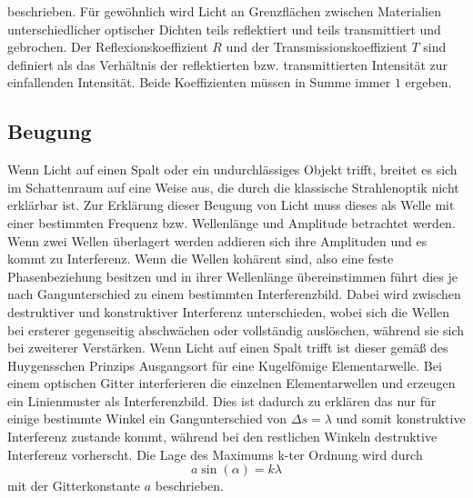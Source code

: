 beschrieben. Für gewöhnlich wird Licht an Grenzflächen zwischen Materialien unterschiedlicher optischer Dichten teils reflektiert und teils transmittiert und gebrochen. Der Reflexionskoeffizient $R$ und der Transmissionskoeffizient $T$ sind definiert als das Verhältnis der reflektierten bzw. transmittierten Intensität zur einfallenden Intensität. Beide Koeffizienten müssen in Summe immer $1$ ergeben.
\subsection{Beugung}
Wenn Licht auf einen Spalt oder ein undurchlässiges Objekt trifft, breitet es sich im Schattenraum auf eine Weise aus, die durch die klassische Strahlenoptik nicht erklärbar ist.
Zur Erklärung dieser Beugung von Licht muss dieses als Welle mit einer bestimmten Frequenz bzw. Wellenlänge und Amplitude betrachtet werden. Wenn zwei Wellen überlagert werden addieren sich ihre Amplituden und es kommt zu Interferenz. Wenn die Wellen kohärent sind, also eine feste Phasenbeziehung besitzen und in ihrer Wellenlänge übereinstimmen führt dies je nach Gangunterschied zu einem bestimmten Interferenzbild. Dabei wird zwischen destruktiver und konstruktiver Interferenz unterschieden, wobei sich die Wellen bei ersterer gegenseitig abschwächen oder vollständig auslöschen, während sie sich bei zweiterer Verstärken. Wenn Licht auf einen Spalt trifft ist dieser gemäß des Huygensschen Prinzips Ausgangsort für eine Kugelfömige Elementarwelle. Bei einem optischen Gitter interferieren die einzelnen Elementarwellen und erzeugen ein Linienmuster als Interferenzbild. Dies ist dadurch zu erklären das nur für einige bestimmte Winkel ein Gangunterschied von $\Delta s=\lambda$ und somit konstruktive Interferenz zustande kommt, während bei den restlichen Winkeln destruktive Interferenz vorherscht. Die Lage des Maximums k-ter Ordnung wird durch
\begin{equation}
a\sin(\alpha)=k\lambda
\end{equation}
mit der Gitterkonstante $a$ beschrieben.

